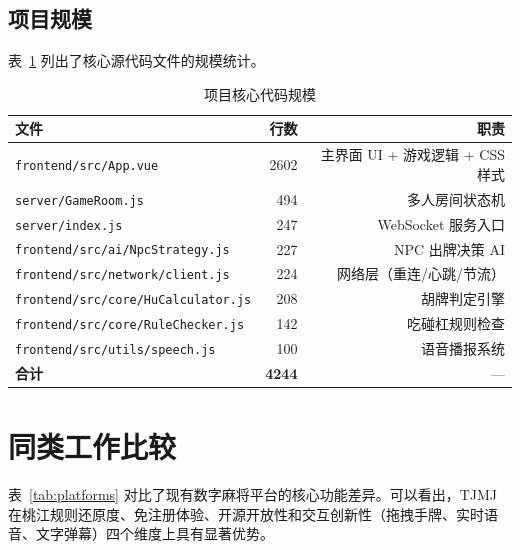 \documentclass[11pt,a4paper]{article}
\begin{document}
\subsection{项目规模}

表~\ref{tab:scale} 列出了核心源代码文件的规模统计。

\begin{table}[H]
\centering
\caption{项目核心代码规模}
\label{tab:scale}
\small
\begin{tabular}{@{}lrr@{}}
\toprule
\textbf{文件} & \textbf{行数} & \textbf{职责} \\
\midrule
\texttt{frontend/src/App.vue} & 2602 & 主界面 UI + 游戏逻辑 + CSS 样式 \\
\texttt{server/GameRoom.js} & 494 & 多人房间状态机 \\
\texttt{server/index.js} & 247 & WebSocket 服务入口 \\
\texttt{frontend/src/ai/NpcStrategy.js} & 227 & NPC 出牌决策 AI \\
\texttt{frontend/src/network/client.js} & 224 & 网络层（重连/心跳/节流） \\
\texttt{frontend/src/core/HuCalculator.js} & 208 & 胡牌判定引擎 \\
\texttt{frontend/src/core/RuleChecker.js} & 142 & 吃碰杠规则检查 \\
\texttt{frontend/src/utils/speech.js} & 100 & 语音播报系统 \\
\midrule
\textbf{合计} & \textbf{4244} & — \\
\bottomrule
\end{tabular}
\end{table}

\newpage
\section{同类工作比较}

表~\ref{tab:platforms} 对比了现有数字麻将平台的核心功能差异。可以看出，TJMJ 在桃江规则还原度、免注册体验、开源开放性和交互创新性（拖拽手牌、实时语音、文字弹幕）四个维度上具有显著优势。
\end{document}
